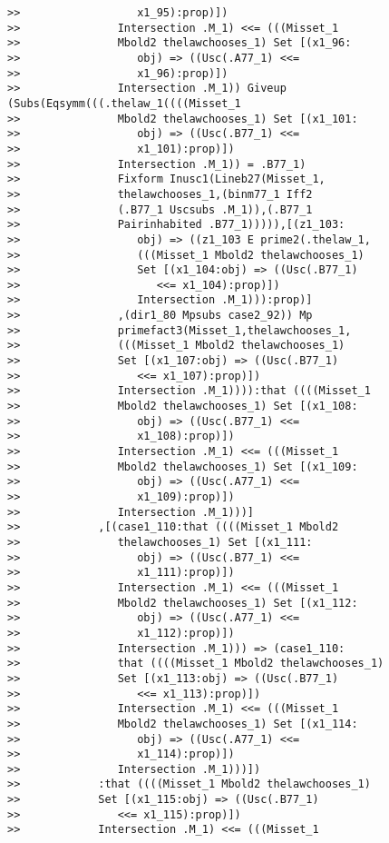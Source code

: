 \documentclass[12pt]{article}
\begin{document}
\begin{verbatim}
>>                  x1_95):prop)])
>>               Intersection .M_1) <<= (((Misset_1
>>               Mbold2 thelawchooses_1) Set [(x1_96:
>>                  obj) => ((Usc(.A77_1) <<=
>>                  x1_96):prop)])
>>               Intersection .M_1)) Giveup (Subs(Eqsymm(((.thelaw_1((((Misset_1
>>               Mbold2 thelawchooses_1) Set [(x1_101:
>>                  obj) => ((Usc(.B77_1) <<=
>>                  x1_101):prop)])
>>               Intersection .M_1)) = .B77_1)
>>               Fixform Inusc1(Lineb27(Misset_1,
>>               thelawchooses_1,(binm77_1 Iff2
>>               (.B77_1 Uscsubs .M_1)),(.B77_1
>>               Pairinhabited .B77_1))))),[(z1_103:
>>                  obj) => ((z1_103 E prime2(.thelaw_1,
>>                  (((Misset_1 Mbold2 thelawchooses_1)
>>                  Set [(x1_104:obj) => ((Usc(.B77_1)
>>                     <<= x1_104):prop)])
>>                  Intersection .M_1))):prop)]
>>               ,(dir1_80 Mpsubs case2_92)) Mp
>>               primefact3(Misset_1,thelawchooses_1,
>>               (((Misset_1 Mbold2 thelawchooses_1)
>>               Set [(x1_107:obj) => ((Usc(.B77_1)
>>                  <<= x1_107):prop)])
>>               Intersection .M_1)))):that ((((Misset_1
>>               Mbold2 thelawchooses_1) Set [(x1_108:
>>                  obj) => ((Usc(.B77_1) <<=
>>                  x1_108):prop)])
>>               Intersection .M_1) <<= (((Misset_1
>>               Mbold2 thelawchooses_1) Set [(x1_109:
>>                  obj) => ((Usc(.A77_1) <<=
>>                  x1_109):prop)])
>>               Intersection .M_1)))]
>>            ,[(case1_110:that ((((Misset_1 Mbold2
>>               thelawchooses_1) Set [(x1_111:
>>                  obj) => ((Usc(.B77_1) <<=
>>                  x1_111):prop)])
>>               Intersection .M_1) <<= (((Misset_1
>>               Mbold2 thelawchooses_1) Set [(x1_112:
>>                  obj) => ((Usc(.A77_1) <<=
>>                  x1_112):prop)])
>>               Intersection .M_1))) => (case1_110:
>>               that ((((Misset_1 Mbold2 thelawchooses_1)
>>               Set [(x1_113:obj) => ((Usc(.B77_1)
>>                  <<= x1_113):prop)])
>>               Intersection .M_1) <<= (((Misset_1
>>               Mbold2 thelawchooses_1) Set [(x1_114:
>>                  obj) => ((Usc(.A77_1) <<=
>>                  x1_114):prop)])
>>               Intersection .M_1)))])
>>            :that ((((Misset_1 Mbold2 thelawchooses_1)
>>            Set [(x1_115:obj) => ((Usc(.B77_1)
>>               <<= x1_115):prop)])
>>            Intersection .M_1) <<= (((Misset_1

\end{verbatim}
\end{document}
